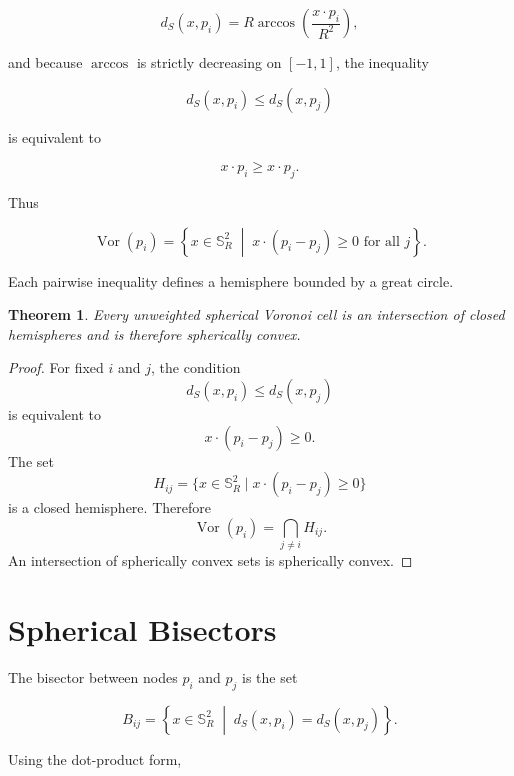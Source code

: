 \documentclass[11pt,fleqn]{book}
\numberwithin{equation}{chapter}
\theoremstyle{plain}
\newtheorem{theorem}{Theorem}[chapter]
\theoremstyle{definition}
\theoremstyle{remark}
\newcommand{\Sphere}{\mathbb{S}^{2}}
\newcommand{\Vor}{\operatorname{Vor}}
\newcommand{\suchthat}{\;\middle|\;}
\begin{document}
\begin{equation}
    d_S(x,p_i)
    =
    R\arccos\left(
      \frac{x\cdot p_i}{R^2}
    \right),
\end{equation}

and because \(\arccos\) is strictly decreasing on \([-1,1]\), the inequality

\begin{equation}
    d_S(x,p_i)
    \leq
    d_S(x,p_j)
\end{equation}

is equivalent to

\begin{equation}
    x\cdot p_i
    \geq
    x\cdot p_j.
\end{equation}

Thus

\begin{equation}
    \Vor(p_i)
    =
    \left\{
    x\in\Sphere_R
    \suchthat
    x\cdot(p_i-p_j)\geq 0
    \text{ for all }j
    \right\}.
\end{equation}

Each pairwise inequality defines a hemisphere bounded by a great circle.

\begin{theorem}
Every unweighted spherical Voronoi cell is an intersection of closed hemispheres and is therefore spherically convex.
\end{theorem}

\begin{proof}
For fixed \(i\) and \(j\), the condition
\[
d_S(x,p_i)\leq d_S(x,p_j)
\]
is equivalent to
\[
x\cdot(p_i-p_j)\geq 0.
\]
The set
\[
H_{ij}
=
\{x\in\Sphere_R\mid x\cdot(p_i-p_j)\geq 0\}
\]
is a closed hemisphere. Therefore
\[
\Vor(p_i)
=
\bigcap_{j\neq i}H_{ij}.
\]
An intersection of spherically convex sets is spherically convex.
\end{proof}

\section{Spherical Bisectors}

The bisector between nodes \(p_i\) and \(p_j\) is the set

\begin{equation}
    B_{ij}
    =
    \left\{
    x\in\Sphere_R
    \suchthat
    d_S(x,p_i)=d_S(x,p_j)
    \right\}.
\end{equation}

Using the dot-product form,
\end{document}
